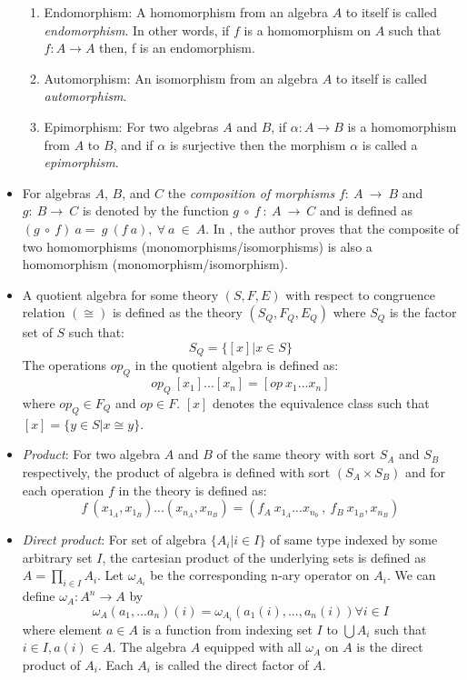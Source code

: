 \begin{itemize}
\begin{enumerate}
        \item Endomorphism: A homomorphism from an algebra $A$ to itself is
        called \textit{endomorphism}. In other words, if $f$ is a homomorphism on $A$
        such that $f:A\rightarrow A$ then, f is an endomorphism.

        \item Automorphism: An isomorphism from an algebra $A$ to itself is
        called \textit{automorphism}.

        \item Epimorphism: For two algebras $A$ and $B$, if \(\alpha : A
        \rightarrow B \) is a homomorphism from $A$ to $B$, and if \(\alpha\) is
        surjective then the morphism \(\alpha\) is called a
        \textit{epimorphism}.
    \end{enumerate}

    \item For algebras $A$, $B$, and $C$ the \textit{composition of morphisms}
    $f:\ A \ \rightarrow \ B$ and $g:\ B \rightarrow\ C$ is denoted by the
    function $g\ \circ \ f\ :\ A\ \rightarrow \ C$ and is defined as $(g\ \circ
    \ f)\ a = \ g\ (f\ a), \ \forall \ a\ \in\ A$. In
    \cite{sankappanavar1981course}, the author proves that the composite of two
    homomorphisms (monomorphisms/isomorphisms) is also a homomorphism
    (monomorphism/isomorphism).

    \item A quotient algebra for some theory $(S,F,E)$ with respect to
    congruence relation $(\cong)$ is defined as the theory $(S_Q,F_Q,E_Q)$ where
    $S_Q$ is the factor set of $S$ such that: \[S_Q = \{[x] | x \in S\}\] The
    operations $op_Q$ in the quotient algebra is defined as: \[op_Q\
    [x_1]...[x_n] = [op\ x_1 ... x_n]\] where $op_Q \in F_Q$ and $op \in F$.
    $[x]$ denotes the equivalence class such that \([x] = \{y \in S | x \cong
    y\}\).

    \item \textit{Product}: For two algebra $A$ and $B$ of the same theory with
    sort $S_A$ and $S_B$ respectively, the product of algebra is defined with
    sort $(S_A \times S_B)$ and for each operation $f$ in the theory is defined as:
    \[f\ (x_{1_A},x_{1_B})...(x_{n_A},x_{n_B}) = (f_A\ x_{1_A}...x_{n_b}\ ,\
    f_B\ x_{1_B},x_{n_B} )\]

    \item \textit{Direct product}: For set of algebra $\{ A_i | i \in I \}$ of
    same type indexed by some arbitrary set $I$, the cartesian product of the
    underlying sets is defined as $A = \displaystyle \prod_{i\in I} A_i$. Let
    $\omega_{A_i}$ be the corresponding n-ary operator on $A_i$. We can define
    $\omega_A : A^{n} \rightarrow A$ by \[ \omega_A(a_1,...a_n)(i) =
    \omega_{A_i} (a_1(i),...,a_n(i)) \forall i \in I\] where element $a \in A$
    is a function from indexing set $I$ to $\bigcup A_i$ such that $i \in I,
    a(i) \in A$. The algebra $A$ equipped with all $\omega_A$ on $A$ is the
    direct product of $A_i$. Each $A_i$ is called the direct factor of $A$.

\end{itemize}